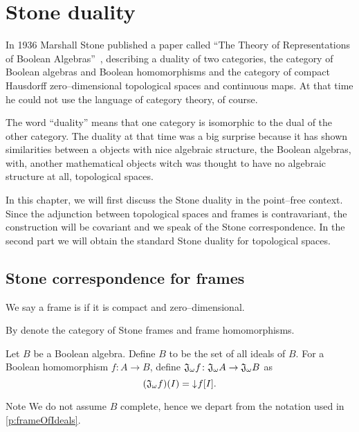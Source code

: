 \chapter{Stone duality}

In 1936 Marshall Stone published a paper called ``The Theory of Representations of Boolean Algebras''~\cite{stone1936theory}, describing a duality of two categories, the category of Boolean algebras and Boolean homomorphisms and the category of compact Hausdorff zero--dimensional topological spaces and continuous maps. At that time he could not use the language of category theory, of course.

The word ``duality'' means that one category is isomorphic to the dual of the other category.
The duality at that time was a big surprise because it has shown similarities between a objects with nice algebraic structure, the Boolean algebras, with, another mathematical objects witch was thought to have no algebraic structure at all, topological spaces.

In this chapter, we will first discuss the Stone duality in the point--free context. Since the adjunction between topological spaces and frames is contravariant, the construction will be covariant and we speak of the Stone correspondence. In the second part we will obtain the standard Stone duality for topological spaces.

\section{Stone correspondence for frames}

\begin{definition}
    We say a frame is  if it is compact and zero--dimensional.

    By \DEF{\StoneFrm{}} denote the category of Stone frames and frame homomorphisms.
\end{definition}

\begin{definition}
    Let $B$ be a Boolean algebra. Define $B$ to be the set of all ideals of $B$.
    For a Boolean homomorphism $f\colon A \to B$, define $\mathfrak{J}_{\omega} f\colon \mathfrak{J}_{\omega} A \to \mathfrak{J}_{\omega} B$ as
    $$(\mathfrak{J}_{\omega} f)(I) = \mathord{\downarrow}\mkern1mu f[I].$$
\end{definition}

\begin{block*}{Note}
    We do not assume $B$ complete, hence we depart from the notation used in \ref{p:frameOfIdeals}.
\end{block*}

